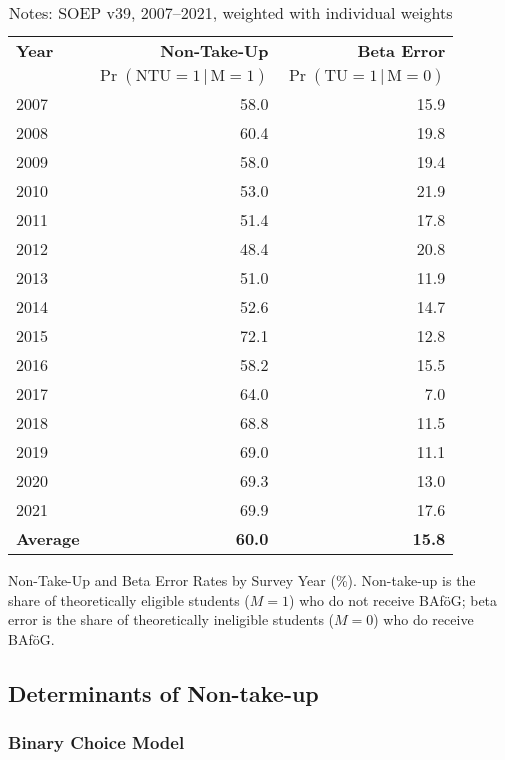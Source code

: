 \begin{table}[htbp]
\centering
\begin{tabular}{l@{\hspace{2em}}r@{\hspace{2em}}r}
\toprule
\textbf{Year} & \textbf{Non-Take-Up}  &  \textbf{Beta Error}  \\
              & \(\Pr(\text{NTU} =1\,|\,\text{M} = 1)\) & \(\Pr(\text{TU} = 1\,|\,\text{M} = 0)\) \\
\midrule
2007 & 58.0 & 15.9 \\
2008 & 60.4 & 19.8 \\
2009 & 58.0 & 19.4 \\
2010 & 53.0 & 21.9 \\
2011 & 51.4 & 17.8 \\
2012 & 48.4 & 20.8 \\
2013 & 51.0 & 11.9 \\
2014 & 52.6 & 14.7 \\
2015 & 72.1 & 12.8 \\
2016 & 58.2 & 15.5 \\
2017 & 64.0 & 7.0 \\
2018 & 68.8 & 11.5 \\
2019 & 69.0 & 11.1 \\
2020 & 69.3 & 13.0 \\
2021 & 69.9 & 17.6 \\
\midrule
\textbf{Average} & \textbf{60.0} & \textbf{15.8} \\
\bottomrule
\end{tabular}
\caption{Non-Take-Up and Beta Error Rates by Survey Year (\%). Non-take-up is the share of theoretically eligible students (\(M=1\)) who do not receive BAföG; beta error is the share of theoretically ineligible students (\(M=0\)) who do receive BAföG.}
\caption*{\small{Notes: SOEP v39, 2007--2021, weighted with individual weights}}
\label{table:microsimulation-ntu}
\end{table}

\subsection{Determinants of Non-take-up}
\subsubsection{Binary Choice Model}


